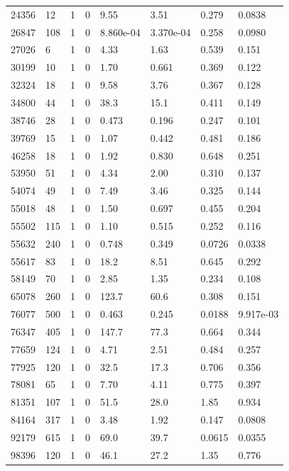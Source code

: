 \documentclass[preview]{standalone}
\begin{document}
{{{{{{{{{{{\begin{tabular}{L{1.2cm}C{1.2cm} C{0.3cm}C{0.5cm} C{1.4cm}C{1.4cm} C{1.4cm}C{1.4cm}}
  24356  &    12  & 1     &  0 &  9.55  & 3.51  & 0.279 &  0.0838   \\ 
  26847  &   108  & 1     &  0 &  8.860e-04  & 3.370e-04  & 0.258 &  0.0980   \\ 
  27026  &     6  & 1     &  0 &  4.33  & 1.63  & 0.539 &  0.151   \\ 
  30199  &    10  & 1     &  0 &  1.70  & 0.661  & 0.369 &  0.122   \\ 
  32324  &    18  & 1     &  0 &  9.58  & 3.76  & 0.367 &  0.128   \\ 
  34800  &    44  & 1     &  0 &  38.3  & 15.1  & 0.411 &  0.149   \\ 
  38746  &    28  & 1     &  0 &  0.473  & 0.196  & 0.247 &  0.101   \\ 
  39769  &    15  & 1     &  0 &  1.07  & 0.442  & 0.481 &  0.186   \\ 
  46258  &    18  & 1     &  0 &  1.92  & 0.830  & 0.648 &  0.251   \\ 
  53950  &    51  & 1     &  0 &  4.34  & 2.00  & 0.310 &  0.137   \\ 
  54074  &    49  & 1     &  0 &  7.49  & 3.46  & 0.325 &  0.144   \\ 
  55018  &    48  & 1     &  0 &  1.50  & 0.697  & 0.455 &  0.204   \\ 
  55502  &   115  & 1     &  0 &  1.10  & 0.515  & 0.252 &  0.116   \\ 
  55632  &   240  & 1     &  0 &  0.748  & 0.349  & 0.0726 &  0.0338   \\ 
  55617  &    83  & 1     &  0 &  18.2  & 8.51  & 0.645 &  0.292   \\ 
  58149  &    70  & 1     &  0 &  2.85  & 1.35  & 0.234 &  0.108   \\ 
  65078  &   260  & 1     &  0 &  123.7  & 60.6  & 0.308 &  0.151   \\ 
  76077  &   500  & 1     &  0 &  0.463  & 0.245  & 0.0188 &  9.917e-03   \\ 
  76347  &   405  & 1     &  0 &  147.7  & 77.3  & 0.664 &  0.344   \\ 
  77659  &   124  & 1     &  0 &  4.71  & 2.51  & 0.484 &  0.257   \\ 
  77925  &   120  & 1     &  0 &  32.5  & 17.3  & 0.706 &  0.356   \\ 
  78081  &    65  & 1     &  0 &  7.70  & 4.11  & 0.775 &  0.397   \\ 
  81351  &   107  & 1     &  0 &  51.5  & 28.0  & 1.85 &  0.934   \\ 
  84164  &   317  & 1     &  0 &  3.48  & 1.92  & 0.147 &  0.0808   \\ 
  92179  &   615  & 1     &  0 &  69.0  & 39.7  & 0.0615 &  0.0355   \\ 
  98396  &   120  & 1     &  0 &  46.1  & 27.2  & 1.35 &  0.776   \\ 
\hline 
\end{tabular} 

}}}}}}}}}}}
\end{document}
